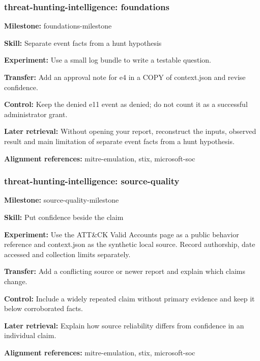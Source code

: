 \subsubsection{threat-hunting-intelligence: foundations}
\noindent\textbf{Milestone:} foundations-milestone\par
\noindent\textbf{Skill:} Separate event facts from a hunt hypothesis\par
\noindent\textbf{Experiment:} Use a small log bundle to write a testable question.\par
\noindent\textbf{Transfer:} Add an approval note for e4 in a COPY of context.json and revise confidence.\par
\noindent\textbf{Control:} Keep the denied e11 event as denied; do not count it as a successful administrator grant.\par
\noindent\textbf{Later retrieval:} Without opening your report, reconstruct the inputs, observed result and main limitation of separate event facts from a hunt hypothesis.\par
\noindent\textbf{Alignment references:} mitre-emulation, stix, microsoft-soc\par
\subsubsection{threat-hunting-intelligence: source-quality}
\noindent\textbf{Milestone:} source-quality-milestone\par
\noindent\textbf{Skill:} Put confidence beside the claim\par
\noindent\textbf{Experiment:} Use the ATT\&CK Valid Accounts page as a public behavior reference and context.json as the synthetic local source. Record authorship, date accessed and collection limits separately.\par
\noindent\textbf{Transfer:} Add a conflicting source or newer report and explain which claims change.\par
\noindent\textbf{Control:} Include a widely repeated claim without primary evidence and keep it below corroborated facts.\par
\noindent\textbf{Later retrieval:} Explain how source reliability differs from confidence in an individual claim.\par
\noindent\textbf{Alignment references:} mitre-emulation, stix, microsoft-soc\par
